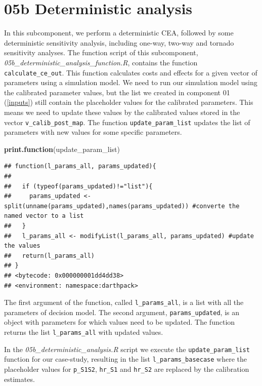 \documentclass[]{book}
\newenvironment{Shaded}{\begin{snugshade}}{\end{snugshade}}
\newcommand{\KeywordTok}[1]{\textcolor[rgb]{0.13,0.29,0.53}{\textbf{#1}}}
\newcommand{\NormalTok}[1]{#1}
\begin{document}
\hypertarget{Deterministic-analysis}{%
\section{05b Deterministic analysis}\label{Deterministic-analysis}}

In this subcomponent, we perform a deterministic CEA, followed by some deterministic sensitivity analysis, including one-way, two-way and tornado sensitivity analyses. The function script of this subcomponent, \emph{05b\_deterministic\_analysis\_function.R}, contains the function \texttt{calculate\_ce\_out}. This function calculates costs and effects for a given vector of parameters using a simulation model. We need to run our simulation model using the calibrated parameter values, but the list we created in component 01 (\ref{inputs}) still contain the placeholder values for the calibrated parameters. This means we need to update these values by the calibrated values stored in the vector \texttt{v\_calib\_post\_map}. The function \texttt{update\_param\_list} updates the list of parameters with new values for some specific parameters.

\begin{Shaded}
\begin{Highlighting}[]
\KeywordTok{print.function}\NormalTok{(update_param_list)}
\end{Highlighting}
\end{Shaded}

\begin{verbatim}
## function(l_params_all, params_updated){
##   
##   if (typeof(params_updated)!="list"){
##     params_updated <- split(unname(params_updated),names(params_updated)) #converte the named vector to a list
##   }
##   l_params_all <- modifyList(l_params_all, params_updated) #update the values
##   return(l_params_all)
## }
## <bytecode: 0x000000001dd4dd38>
## <environment: namespace:darthpack>
\end{verbatim}

The first argument of the function, called \texttt{l\_params\_all}, is a list with all the parameters of decision model. The second argument, \texttt{params\_updated}, is an object with parameters for which values need to be updated. The function returns the list \texttt{l\_params\_all} with updated values.

In the \emph{05b\_deterministic\_analysis.R} script we execute the \texttt{update\_param\_list} function for our case-study, resulting in the list \texttt{l\_params\_basecase} where the placeholder values for \texttt{p\_S1S2}, \texttt{hr\_S1} and \texttt{hr\_S2} are replaced by the calibration estimates.
\end{document}
